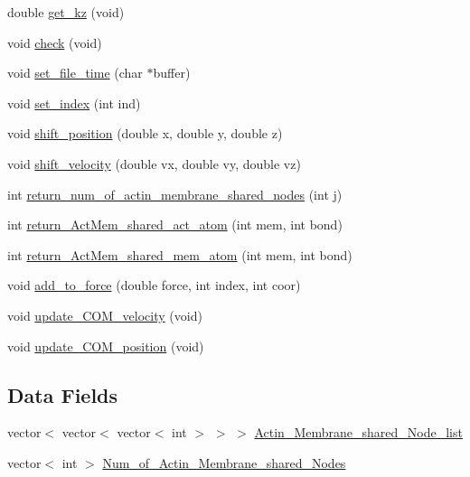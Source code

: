 \begin{DoxyCompactItemize}
\item 
double \mbox{\hyperlink{classActin_a1837de15df7fd87c331af0ecbf1fbbd1}{get\+\_\+kz}} (void)
\item 
void \mbox{\hyperlink{classActin_abb02feefaf5bfccbcee6cd1637f3c742}{check}} (void)
\item 
void \mbox{\hyperlink{classActin_ae38649ca8146edc88562229715a1a4b6}{set\+\_\+file\+\_\+time}} (char $\ast$buffer)
\item 
void \mbox{\hyperlink{classActin_a507b129521e48ef9aa5b47398e5d1213}{set\+\_\+index}} (int ind)
\item 
void \mbox{\hyperlink{classActin_abc3996bfa64fb278823dc4e85c4ec9a4}{shift\+\_\+position}} (double x, double y, double z)
\item 
void \mbox{\hyperlink{classActin_ad98f0f42b66ec4d8b5fefb2ecec47a60}{shift\+\_\+velocity}} (double vx, double vy, double vz)
\item 
int \mbox{\hyperlink{classActin_ad6b6cfbc32c772aa024eafa5caea16ab}{return\+\_\+num\+\_\+of\+\_\+actin\+\_\+membrane\+\_\+shared\+\_\+nodes}} (int j)
\item 
int \mbox{\hyperlink{classActin_a684cd8de234f9b7397c450fdb431af6b}{return\+\_\+\+Act\+Mem\+\_\+shared\+\_\+act\+\_\+atom}} (int mem, int bond)
\item 
int \mbox{\hyperlink{classActin_afc71b2d84af65834f2ca7390d8bd974f}{return\+\_\+\+Act\+Mem\+\_\+shared\+\_\+mem\+\_\+atom}} (int mem, int bond)
\item 
void \mbox{\hyperlink{classActin_afb396a5e38dede5d41066f6f1c5893ed}{add\+\_\+to\+\_\+force}} (double force, int index, int coor)
\item 
void \mbox{\hyperlink{classActin_a2f171e0eab1ee13c538ca25c8cf69aa9}{update\+\_\+\+C\+O\+M\+\_\+velocity}} (void)
\item 
void \mbox{\hyperlink{classActin_a501f81fc7093ff06593c5549afd1167b}{update\+\_\+\+C\+O\+M\+\_\+position}} (void)
\end{DoxyCompactItemize}
\subsection*{Data Fields}
\begin{DoxyCompactItemize}
\item 
vector$<$ vector$<$ vector$<$ int $>$ $>$ $>$ \mbox{\hyperlink{classActin_a575a56b45d7492503465078635e6340f}{Actin\+\_\+\+Membrane\+\_\+shared\+\_\+\+Node\+\_\+list}}
\item 
vector$<$ int $>$ \mbox{\hyperlink{classActin_aad926245a82c384b8e81dc55afec2f34}{Num\+\_\+of\+\_\+\+Actin\+\_\+\+Membrane\+\_\+shared\+\_\+\+Nodes}}
\end{DoxyCompactItemize}


